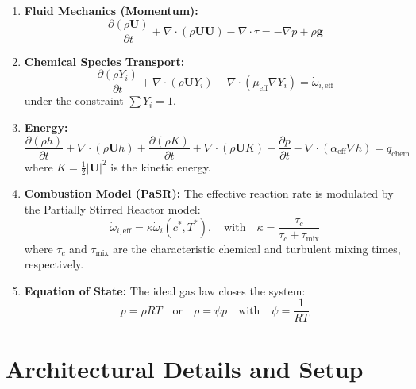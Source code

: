 ﻿\documentclass[a4paper,12pt]{article}
\theoremstyle{definition}
\theoremstyle{remark}
\begin{document}
\begin{enumerate}
    \item \textbf{Fluid Mechanics (Momentum):}
    \begin{equation}
        \frac{\partial(\rho\mathbf{U})}{\partial t} + \nabla \cdot (\rho\mathbf{U}\mathbf{U}) - \nabla \cdot \tau = -\nabla p + \rho\mathbf{g}
    \end{equation}

    \item \textbf{Chemical Species Transport:}
    \begin{equation}
        \frac{\partial(\rho Y_i)}{\partial t} + \nabla \cdot (\rho\mathbf{U}Y_i) - \nabla \cdot (\mu_{\mathrm{eff}}\nabla Y_i) = \dot{\omega}_{i,\mathrm{eff}}
    \end{equation}
    under the constraint $\sum Y_i = 1$.

    \item \textbf{Energy:}
    \begin{equation}
        \frac{\partial(\rho h)}{\partial t} + \nabla \cdot (\rho\mathbf{U}h) + \frac{\partial(\rho K)}{\partial t} + \nabla \cdot (\rho\mathbf{U}K) - \frac{\partial p}{\partial t} - \nabla \cdot (\alpha_{\mathrm{eff}}\nabla h) = \dot{q}_{\mathrm{chem}}
    \end{equation}
    where $K = \frac{1}{2}|\mathbf{U}|^2$ is the kinetic energy.

    \item \textbf{Combustion Model (PaSR):}
    The effective reaction rate is modulated by the Partially Stirred Reactor model:
    \begin{equation}
        \dot{\omega}_{i,\mathrm{eff}} = \kappa\dot{\omega}_i(c^*, T^*), \quad \text{with} \quad \kappa = \frac{\tau_c}{\tau_c + \tau_{\mathrm{mix}}}
    \end{equation}
    where $\tau_c$ and $\tau_{\mathrm{mix}}$ are the characteristic chemical and turbulent mixing times, respectively.

    \item \textbf{Equation of State:}
    The ideal gas law closes the system:
    \begin{equation}
        p = \rho R T \quad \text{or} \quad \rho = \psi p \quad \text{with} \quad \psi = \frac{1}{R T}
    \end{equation}
\end{enumerate}

\clearpage
\section{Architectural Details and Setup}
\label{app:architecture}
\end{document}
